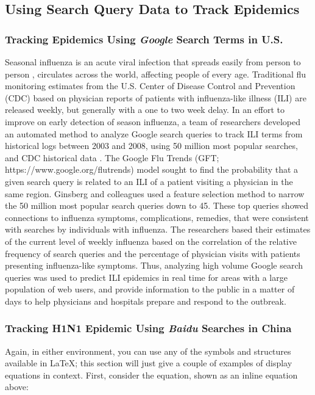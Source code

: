 \documentclass[sigconf]{acmart}
\begin{document}
\subsection{Using Search Query Data to Track Epidemics}

\subsubsection{Tracking Epidemics Using {\itshape Google} Search Terms in U.S.}

Seasonal influenza is an acute viral infection that spreads easily from person to 
person , circulates across the world, affecting people of every age. Traditional 
flu monitoring estimates from the U.S. Center of Disease Control and Prevention 
(CDC) based on physician reports of patients with influenza-like illness (ILI) are 
released weekly, but generally with a one to two week delay. In an effort to improve 
on early detection of season influenza, a team of researchers developed an automated 
method to analyze Google search queries to track ILI terms from historical logs 
between 2003 and 2008, using 50 million most popular searches, and CDC historical 
data \cite{ginsburg09}. The Google Flu Trends (GFT; https://www.google.org/flutrends) 
model sought to find the probability that a given search query is related to an ILI 
of a patient visiting a physician in the same region. Ginsberg and colleagues used 
a feature selection method to narrow  the 50 million most popular search queries down 
to 45. These top queries showed connections to influenza symptoms, complications, 
remedies, that were consistent with searches by individuals with influenza. The 
researchers based their estimates of the current level of weekly influenza based on 
the correlation of the relative frequency of search queries and the percentage of 
physician visits with patients presenting influenza-like symptoms. Thus, analyzing 
high volume Google search queries was used to predict ILI epidemics in real time for 
areas with a large population of web users, and provide information to the public in 
a matter of days to help physicians and hospitals prepare and respond to the outbreak. 

\subsubsection{Tracking H1N1 Epidemic Using {\itshape Baidu} Searches in China}

Again, in either environment, you can use any of the symbols
and structures available in \LaTeX\@; this section will just
give a couple of examples of display equations in context.
First, consider the equation, shown as an inline equation above:
\end{document}
